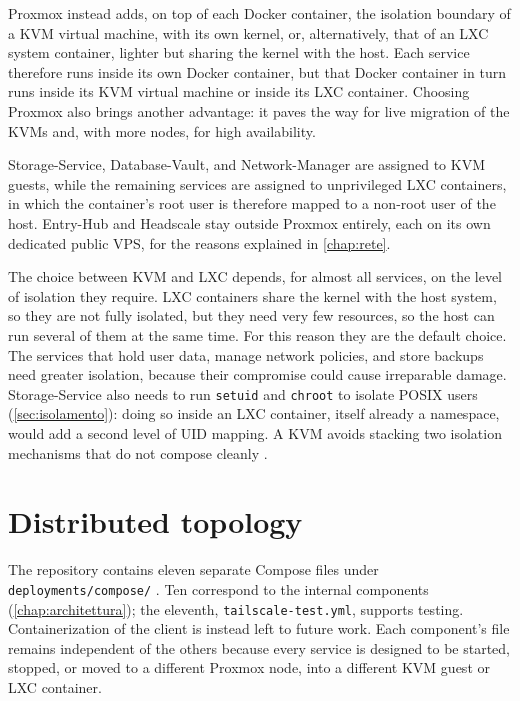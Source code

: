 Proxmox instead adds, on top of each Docker container, the isolation boundary of a KVM virtual machine,
with its own kernel, or, alternatively, that of an LXC system container, lighter but sharing the kernel
with the host. Each service therefore runs inside its own Docker container, but that
Docker container in turn runs inside its KVM virtual machine or inside its LXC container.
Choosing Proxmox also brings another advantage: it paves the way for live migration of the KVMs
and, with more nodes, for high availability.

Storage-Service, Database-Vault, and Network-Manager are assigned to KVM guests, while the remaining
services are assigned to unprivileged LXC containers, in which the container's root user is therefore mapped
to a non-root user of the host.
Entry-Hub and Headscale stay outside Proxmox entirely, each on its own dedicated public VPS, for the
reasons explained in \autoref{chap:rete}.

The choice between KVM and LXC depends, for almost all services, on the level of isolation they require.
LXC containers share the kernel with the host system, so they are not fully isolated, but
they need very few resources, so the host can run several of them at the same time. For this
reason they are the default choice.
The services that hold user data, manage network policies, and store backups need
greater isolation, because their compromise could cause irreparable damage.
Storage-Service also needs to run \texttt{setuid} and \texttt{chroot} to isolate POSIX
users (\autoref{sec:isolamento}): doing so inside an LXC container, itself already a namespace,
would add a second level of UID mapping. A KVM avoids stacking
two isolation mechanisms that do not compose cleanly \cite{ramusb-proxmox-storage-service}.

\section{Distributed topology}
\label{sec:topologia-distribuita}

The repository contains eleven separate Compose files under \texttt{deployments/compose/}
\cite{ramusb-code-compose-tree}. Ten correspond to the internal components
(\autoref{chap:architettura}); the eleventh, \texttt{tailscale-test.yml}, supports testing.
Containerization of the client is instead left to future work.
Each component's file remains independent of the others because every service is designed to be
started, stopped, or moved to a different Proxmox node, into a different KVM guest or LXC container.

